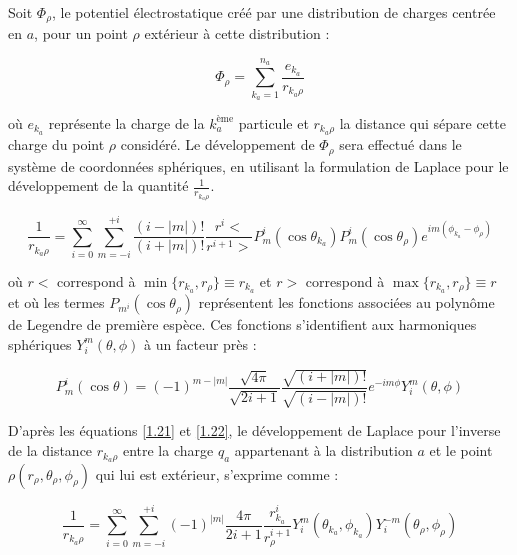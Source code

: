	Soit $\Phi_{\rho}$, le potentiel électrostatique créé par une distribution de charges centrée en $a$, pour un point $\rho$ extérieur à cette distribution : 
	
	\begin{equation}
	\Phi_{\rho} = \sum_{k_{a}=1}^{n_{a}} \frac{e_{k_{a}}}{r_{k_{a}\rho}} \label{1.20}
	\end{equation}
	
	\noindent où $e_{k_{a}}$ représente la charge de la $k_{a}^{\text{ème}}$ particule et $r_{k_{a}\rho}$ la distance qui sépare cette charge du point $\rho$ considéré. Le développement de $\Phi_{\rho}$ sera effectué dans le système de coordonnées sphériques, en utilisant la formulation de Laplace pour le développement de la quantité $\frac{1}{r_{k_{a}\rho}}$.
	
	\begin{equation}
	\frac{1}{r_{k_{a}\rho}} = \sum_{i=0}^{\infty} \sum_{m=-i}^{+i} \frac{(i-|m|)!}{(i+ |m|)!} \frac{r^{i}<}{r^{i+1}>} P_{m}^{i} (\cos\theta_{k_{a}}) P^{i}_{m}(\cos\theta_{\rho})e^{im(\phi_{k_{a}}- \phi_{\rho})} \label{1.21}
	\end{equation}
	
	où $r <$ correspond à $\min \{r_{k_{a}}, r_{\rho}\} \equiv r_{k_{a}}$ et
	$r >$ correspond à $\max \{r_{k_{a}}, r_{\rho}\} \equiv r$
	et où les termes $P_{m^{i}} (\cos\theta_{\rho})$ représentent les fonctions associées au polynôme de Legendre de première espèce. Ces fonctions s'identifient aux harmoniques sphériques $Y_{i}^{m}(\theta,\phi)$ à un facteur près : 
	
	\begin{equation}
	P_{m}^{i}(\cos\theta) = (-1)^{m-|m|} \frac{\sqrt{4\pi}}{\sqrt{2i+ 1}} \frac{\sqrt{(i+ |m|)!}}{\sqrt{(i-|m|)!}} e^{-im\phi} Y_{i}^{m}(\theta,\phi) \label{1.22}
	\end{equation}
	
	D'après les équations \ref{1.21} et \ref{1.22}, le développement de Laplace pour l'inverse de la distance $r_{k_{a}\rho}$ entre la charge $q_{a}$ appartenant à la distribution $a$ et le point $\rho(r_{\rho}, \theta_{\rho}, \phi_{\rho})$ qui lui est extérieur, s'exprime comme : 
	
	\begin{equation}
	\frac{1}{r_{k_{a}\rho}} = \sum_{i=0}^{\infty} \sum_{m=-i}^{+i} (-1)^{|m|} \frac{4\pi}{2i +1} \frac{r_{k_{a}}^{i}}{r_{\rho}^{i+1}} Y^{m}_{i} (\theta_{k_{a}}, \phi_{k_{a}}) Y_{i}^{-m} (\theta_{\rho},\phi_{\rho})  \label{1.23}
	\end{equation}
	
